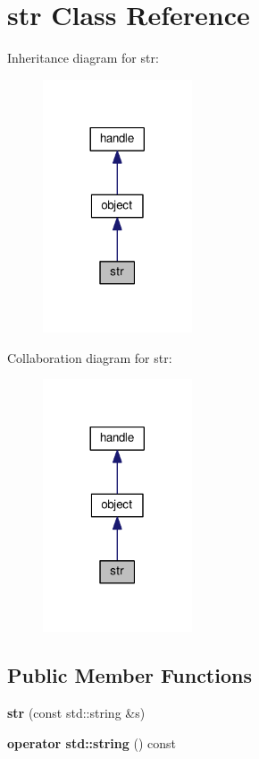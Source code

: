 \hypertarget{classstr}{}\section{str Class Reference}
\label{classstr}


Inheritance diagram for str\+:
\nopagebreak
\begin{figure}[H]
\begin{center}
\leavevmode
\includegraphics[width=125pt]{classstr__inherit__graph}
\end{center}
\end{figure}


Collaboration diagram for str\+:
\nopagebreak
\begin{figure}[H]
\begin{center}
\leavevmode
\includegraphics[width=125pt]{classstr__coll__graph}
\end{center}
\end{figure}
\subsection*{Public Member Functions}
\begin{DoxyCompactItemize}
\item 
{\bfseries str} (const std\+::string \&s)\hypertarget{classstr_aefc81e0d991f5df7e9d2e57a32308c33}{}\label{classstr_aefc81e0d991f5df7e9d2e57a32308c33}

\item 
{\bfseries operator std\+::string} () const \hypertarget{classstr_ab1b2a3b7353801633151a1dba5facbe6}{}\label{classstr_ab1b2a3b7353801633151a1dba5facbe6}

\end{DoxyCompactItemize}
